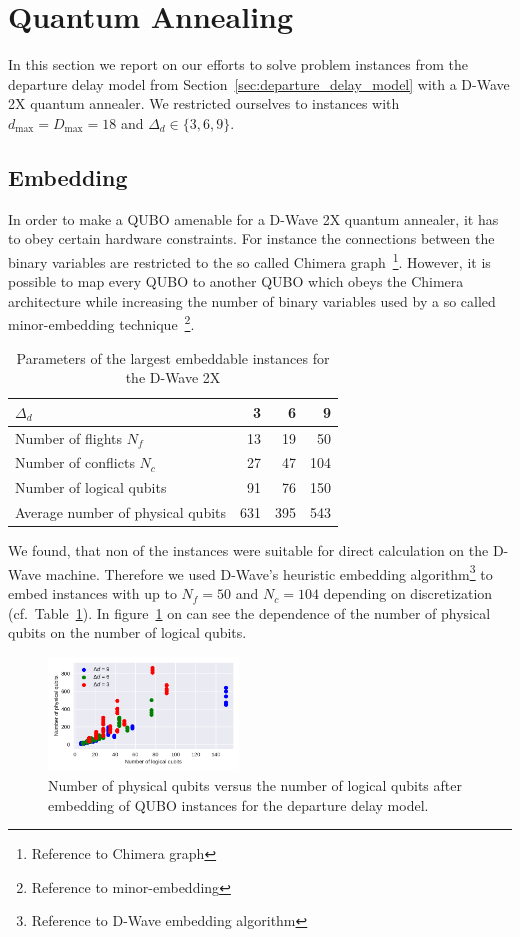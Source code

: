 \section{Quantum Annealing}
In this section we report on our efforts to solve problem instances from the departure delay model from Section~\ref{sec:departure_delay_model} with a D-Wave 2X quantum annealer.
We restricted ourselves to instances with $d_\text{max}=D_\text{max}=18$ and $\Delta_d \in \{3, 6, 9\}$.
\subsection{Embedding}
In order to make a QUBO amenable for a D-Wave 2X quantum annealer, it has to obey certain hardware constraints.
For instance the connections between the binary variables are restricted to the so called Chimera graph~\footnote{Reference to Chimera graph}.
However, it is possible to map every QUBO to another QUBO which obeys the Chimera architecture while increasing the number of binary variables used by a so called minor-embedding technique~\footnote{Reference to minor-embedding}. 

\begin{table}[htpb]
    \begin{tabular}{lrrr}
    \toprule
    $\Delta_d$ &    3 &    6 &    9 \\
    \midrule
    Number of flights $N_f$   &   13 &   19 &   50 \\
    Number of conflicts $N_c$ &   27 &   47 &  104 \\
    Number of logical qubits  &   91 &   76 &  150 \\
    Average number of physical qubits &  631 &  395 &  543 \\
    \bottomrule
    \end{tabular}
    \caption{Parameters of the largest embeddable instances for the D-Wave 2X}
\label{tab:embedding}
\end{table}

We found, that non of the instances were suitable for direct calculation on the D-Wave machine.
Therefore we used D-Wave's heuristic embedding algorithm\footnote{Reference to D-Wave embedding algorithm} to embed instances with up to $N_f=50$ and $N_c=104$ depending on discretization (cf.\ Table~\ref{tab:embedding}).
In figure~\ref{fig:number_of_physical_qubits} on can see the dependence of the number of physical qubits on the number of logical qubits.


\begin{figure}[htpb]
    \centering
    \includegraphics[width=0.45\textwidth]{./pics/physicalVsLogicalNumberOfQubits.pdf}
    \caption{Number of physical qubits versus the number of logical qubits after embedding of QUBO instances for the departure delay model.}
\label{fig:number_of_physical_qubits}
\end{figure}




